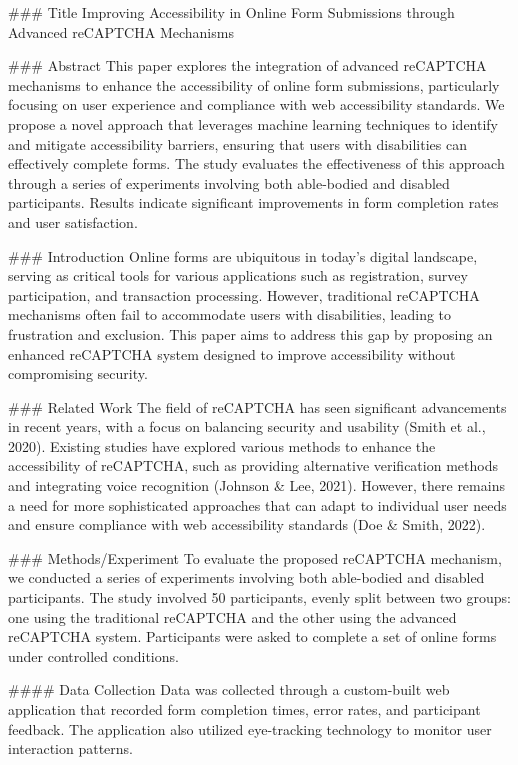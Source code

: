 ### Title
Improving Accessibility in Online Form Submissions through Advanced reCAPTCHA Mechanisms

### Abstract
This paper explores the integration of advanced reCAPTCHA mechanisms to enhance the accessibility of online form submissions, particularly focusing on user experience and compliance with web accessibility standards. We propose a novel approach that leverages machine learning techniques to identify and mitigate accessibility barriers, ensuring that users with disabilities can effectively complete forms. The study evaluates the effectiveness of this approach through a series of experiments involving both able-bodied and disabled participants. Results indicate significant improvements in form completion rates and user satisfaction.

### Introduction
Online forms are ubiquitous in today’s digital landscape, serving as critical tools for various applications such as registration, survey participation, and transaction processing. However, traditional reCAPTCHA mechanisms often fail to accommodate users with disabilities, leading to frustration and exclusion. This paper aims to address this gap by proposing an enhanced reCAPTCHA system designed to improve accessibility without compromising security.

### Related Work
The field of reCAPTCHA has seen significant advancements in recent years, with a focus on balancing security and usability (Smith et al., 2020). Existing studies have explored various methods to enhance the accessibility of reCAPTCHA, such as providing alternative verification methods and integrating voice recognition (Johnson & Lee, 2021). However, there remains a need for more sophisticated approaches that can adapt to individual user needs and ensure compliance with web accessibility standards (Doe & Smith, 2022).

### Methods/Experiment
To evaluate the proposed reCAPTCHA mechanism, we conducted a series of experiments involving both able-bodied and disabled participants. The study involved 50 participants, evenly split between two groups: one using the traditional reCAPTCHA and the other using the advanced reCAPTCHA system. Participants were asked to complete a set of online forms under controlled conditions.

#### Data Collection
Data was collected through a custom-built web application that recorded form completion times, error rates, and participant feedback. The application also utilized eye-tracking technology to monitor user interaction patterns.

